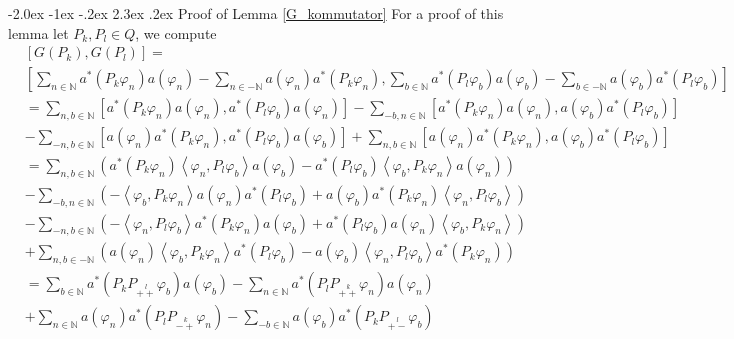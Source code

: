 \documentclass[oneside,reqno,12pt]{amsart}
\makeatletter
\renewcommand\section{\@startsection {section}{1}{\z@}%
                                   {-2.0ex \@plus -1ex \@minus -.2ex}%
                                   {2.3ex \@plus.2ex}%
                                   {\normalfont\Large\bfseries}}
\makeatother
\begin{document}
\section{Proof of Lemma \ref{G_kommutator}}\label{sec::G_kommutator}
For a proof of this lemma let \(P_k,P_l \in Q\), we compute
\begin{align*}
&\left[G(P_k),G(P_l)\right]=\\
&\left[\sum_{n\in\mathbb{N}} a^*\left(P_k\varphi_n\right)a(\varphi_n) 
- \sum_{n\in -\mathbb{N}} a(\varphi_n) a^*\left(P_k \varphi_n\right) ,
\sum_{b\in\mathbb{N}} a^*\left(P_l\varphi_b\right)a(\varphi_b) 
- \sum_{b\in -\mathbb{N}} a(\varphi_b) a^*\left(P_l \varphi_b\right) \right]\\
&=\sum_{n,b\in\mathbb{N}} \left[ a^*\left(P_k\varphi_n\right) a(\varphi_n), a^*\left(P_l\varphi_b\right)a(\varphi_n)\right]
-\sum_{-b,n\in\mathbb{N}}\left[a^*\left(P_k\varphi_n\right)a(\varphi_n), a(\varphi_b) a^*\left(P_l\varphi_b\right)\right]\\
&-\sum_{-n,b\in\mathbb{N}}\left[a(\varphi_n)a^*\left(P_k\varphi_n\right),a^*\left(P_l\varphi_b\right)a(\varphi_b)\right]
+\sum_{n,b\in\mathbb{N}}\left[ a(\varphi_n)a^*\left(P_k\varphi_n\right), a(\varphi_b)a^*\left(P_l\varphi_b\right)\right]\\
&=\sum_{n,b\in\mathbb{N}} \left(a^*\left(P_k\varphi_n\right)\left<\varphi_n,P_l\varphi_b\right>a(\varphi_b)-a^*\left(P_l\varphi_b\right) \left<\varphi_b,P_k\varphi_n\right>a(\varphi_n) \right)\\
&-\sum_{-b,n\in\mathbb{N}}\left( - \left<\varphi_b,P_k \varphi_n\right>a(\varphi_n)a^*\left(P_l\varphi_b\right) + a(\varphi_b) a^*\left(P_k\varphi_n\right)\left<\varphi_n,P_l\varphi_b\right>\right)\\
&-\sum_{-n,b\in\mathbb{N}} \left( - \left< \varphi_n,P_l\varphi_b\right> a^*\left(P_k\varphi_n\right) a(\varphi_b) + a^*\left(P_l\varphi_b\right)a(\varphi_n)\left<\varphi_b,P_k\varphi_n\right>\right)\\
&+\sum_{n,b\in -\mathbb{N}} \left(a(\varphi_n) \left< \varphi_b,P_k\varphi_n\right>a^*\left(P_l\varphi_b\right)-a(\varphi_b)\left<\varphi_n,P_l\varphi_b\right> a^*\left(P_k\varphi_n\right)\right)\\
&=\sum_{b\in\mathbb{N}} a^*\left(P_k P_{\stackrel{l}{++}}\varphi_b\right)a(\varphi_b) - \sum_{n\in\mathbb{N}}a^*\left(P_l P_{\stackrel{k}{++}}\varphi_n\right)a(\varphi_n)\\
&+\sum_{n\in\mathbb{N}}a(\varphi_n)a^*\left(P_l P_{\stackrel{k}{-+}}\varphi_n\right) - \sum_{-b\in\mathbb{N}} a(\varphi_b)a^*\left(P_k P_{\stackrel{l}{+-}}\varphi_b\right)\\

\end{align*}
\end{document}
